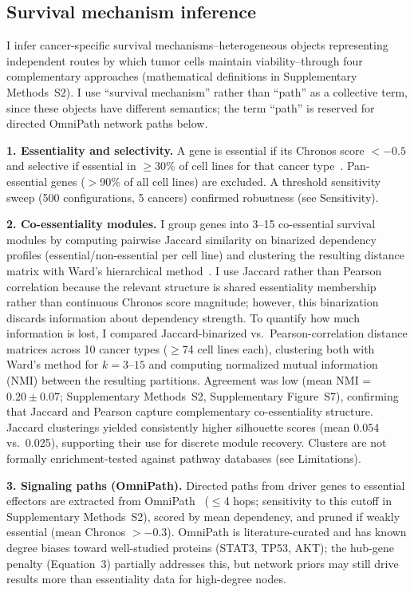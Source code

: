 \documentclass[times, twoside, watermark]{zHenriquesLab-StyleBioRxiv}
\begin{document}
\subsection*{Survival mechanism inference}
I infer cancer-specific survival mechanisms--heterogeneous objects representing independent routes by which tumor cells maintain viability--through four complementary approaches (mathematical definitions in Supplementary Methods~S2). I use ``survival mechanism'' rather than ``path'' as a collective term, since these objects have different semantics; the term ``path'' is reserved for directed OmniPath network paths below.

\textbf{1. Essentiality and selectivity.} A gene is essential if its Chronos score $< -0.5$ and selective if essential in $\geq$30\% of cell lines for that cancer type~\cite{Dempster2021,Behan2019}. Pan-essential genes ($>$90\% of all cell lines) are excluded. A threshold sensitivity sweep (500 configurations, 5 cancers) confirmed robustness (see Sensitivity).

\textbf{2. Co-essentiality modules.} I group genes into 3--15 co-essential survival modules by computing pairwise Jaccard similarity on binarized dependency profiles (essential/non-essential per cell line) and clustering the resulting distance matrix with Ward's hierarchical method~\cite{Pan2018}. I use Jaccard rather than Pearson correlation because the relevant structure is shared essentiality membership rather than continuous Chronos score magnitude; however, this binarization discards information about dependency strength. To quantify how much information is lost, I compared Jaccard-binarized vs.\ Pearson-correlation distance matrices across 10 cancer types ($\geq$74 cell lines each), clustering both with Ward's method for $k = 3$--$15$ and computing normalized mutual information (NMI) between the resulting partitions. Agreement was low (mean NMI = $0.20 \pm 0.07$; Supplementary Methods~S2, Supplementary Figure~S7), confirming that Jaccard and Pearson capture complementary co-essentiality structure. Jaccard clusterings yielded consistently higher silhouette scores (mean 0.054 vs.\ 0.025), supporting their use for discrete module recovery. Clusters are not formally enrichment-tested against pathway databases (see Limitations).

\textbf{3. Signaling paths (OmniPath).} Directed paths from driver genes to essential effectors are extracted from OmniPath~\cite{Turei2026} ($\leq$4 hops; sensitivity to this cutoff in Supplementary Methods~S2), scored by mean dependency, and pruned if weakly essential (mean Chronos $> -0.3$). OmniPath is literature-curated and has known degree biases toward well-studied proteins (STAT3, TP53, AKT); the hub-gene penalty (Equation~3) partially addresses this, but network priors may still drive results more than essentiality data for high-degree nodes.
\end{document}
